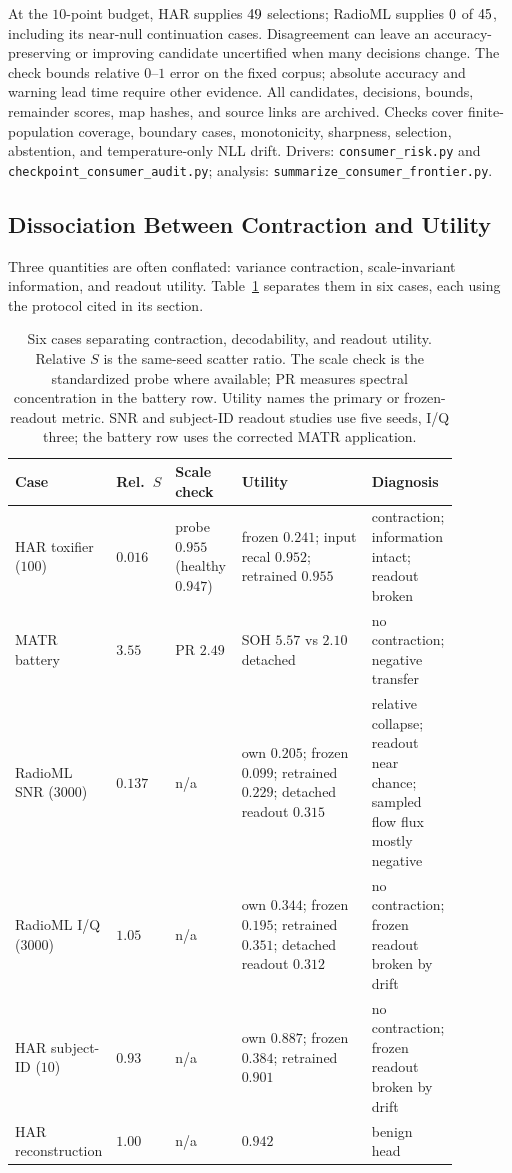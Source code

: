 \documentclass{article}
\begin{document}
At the $10$-point budget, HAR supplies $49$ selections; RadioML supplies $0$ of $45$, including its near-null continuation cases. Disagreement can leave an accuracy-preserving or improving candidate uncertified when many decisions change. The check bounds relative $0$--$1$ error on the fixed corpus; absolute accuracy and warning lead time require other evidence. All candidates, decisions, bounds, remainder scores, map hashes, and source links are archived. Checks cover finite-population coverage, boundary cases, monotonicity, sharpness, selection, abstention, and temperature-only NLL drift. Drivers: \texttt{consumer\_risk.py} and \texttt{checkpoint\_consumer\_audit.py}; analysis: \texttt{summarize\_consumer\_frontier.py}.

\subsection{Dissociation Between Contraction and Utility}\label{app:dissociation}

Three quantities are often conflated: variance contraction, scale-invariant information, and readout utility. Table~\ref{tab:dissociation} separates them in six cases, each using the protocol cited in its section.

\begin{table}[h]
\centering
\caption{Six cases separating contraction, decodability, and readout utility. Relative $S$ is the same-seed scatter ratio. The scale check is the standardized probe where available; PR measures spectral concentration in the battery row. Utility names the primary or frozen-readout metric. SNR and subject-ID readout studies use five seeds, I/Q three; the battery row uses the corrected MATR application.}
\label{tab:dissociation}
\footnotesize
\begin{tabular}{p{0.18\linewidth}p{0.07\linewidth}p{0.15\linewidth}p{0.31\linewidth}p{0.17\linewidth}}
\toprule
Case & Rel.\ $S$ & Scale check & Utility & Diagnosis \\
\midrule
HAR toxifier ($100$) & $0.016$ & probe $0.955$ (healthy $0.947$) & frozen $0.241$; input recal $0.952$; retrained $0.955$ & contraction; information intact; readout broken \\
MATR battery & $3.55$ & PR $2.49$ & SOH $5.57$ vs $2.10$ detached & no contraction; negative transfer \\
RadioML SNR ($3000$) & $0.137$ & n/a & own $0.205$; frozen $0.099$; retrained $0.229$; detached readout $0.315$ & relative collapse; readout near chance; sampled flow flux mostly negative \\
RadioML I/Q ($3000$) & $1.05$ & n/a & own $0.344$; frozen $0.195$; retrained $0.351$; detached readout $0.312$ & no contraction; frozen readout broken by drift \\
HAR subject-ID ($10$) & $0.93$ & n/a & own $0.887$; frozen $0.384$; retrained $0.901$ & no contraction; frozen readout broken by drift \\
HAR reconstruction & $1.00$ & n/a & $0.942$ & benign head \\
\bottomrule
\end{tabular}
\end{table}
\end{document}
